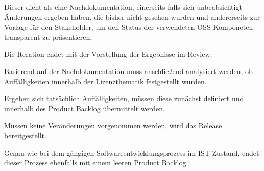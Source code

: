 Dieser dient als eine Nachdokumentation, einerseits falls sich unbeabsichtigt Änderungen ergeben haben, die bisher nicht gesehen wurden und andererseits zur Vorlage für den Stakeholder, um den Status der verwendeten OSS-Komponeten transparent zu präsentieren. 

Die Iteration endet mit der Vorstellung der Ergebnisse im Review. 

Basierend auf der Nachdokumentation muss anschließend analysiert werden, ob Auffälligkeiten innerhalb der Lizenzthematik festgestellt wurden.  

Ergeben sich tatsächlich Auffälligkeiten, müssen diese zunächst definiert und innerhalb des Product Backlog übermittelt werden. 

Müssen keine Veränderungen vorgenommen werden, wird das Release bereitgestellt. 

Genau wie bei dem gängigen Softwareentwicklungsprozess im IST-Zustand, endet dieser Prozess ebenfalls mit einem leeren Product Backlog.  

















